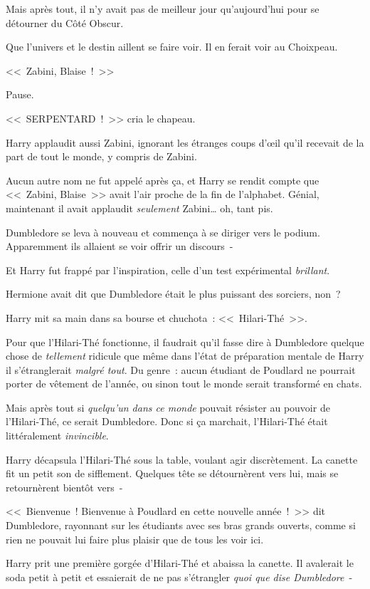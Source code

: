 Mais après tout, il n'y avait pas de meilleur jour qu'aujourd'hui pour se détourner du Côté Obscur.

Que l'univers et le destin aillent se faire voir. Il en ferait voir au Choixpeau.

<<~Zabini, Blaise~!~>>

Pause.

<<~SERPENTARD~!~>> cria le chapeau.

Harry applaudit aussi Zabini, ignorant les étranges coups d'œil qu'il recevait de la part de tout le monde, y compris de Zabini.

Aucun autre nom ne fut appelé après ça, et Harry se rendit compte que <<~Zabini, Blaise~>> avait l'air proche de la fin de l'alphabet. Génial, maintenant il avait applaudit \emph{seulement} Zabini… oh, tant pis.

Dumbledore se leva à nouveau et commença à se diriger vers le podium. Apparemment ils allaient se voir offrir un discours~-

Et Harry fut frappé par l'inspiration, celle d'un test expérimental \emph{brillant}.

Hermione avait dit que Dumbledore était le plus puissant des sorciers, non~?

Harry mit sa main dans sa bourse et chuchota~: <<~Hilari-Thé~>>.

Pour que l'Hilari-Thé fonctionne, il faudrait qu'il fasse dire à Dumbledore quelque chose de \emph{tellement} ridicule que même dans l'état de préparation mentale de Harry il s'étranglerait \emph{malgré tout}. Du genre~: aucun étudiant de Poudlard ne pourrait porter de vêtement de l'année, ou sinon tout le monde serait transformé en chats.

Mais après tout si \emph{quelqu'un dans ce monde} pouvait résister au pouvoir de l'Hilari-Thé, ce serait Dumbledore. Donc si ça marchait, l'Hilari-Thé était littéralement \emph{invincible}.

Harry décapsula l'Hilari-Thé sous la table, voulant agir discrètement. La canette fit un petit son de sifflement. Quelques tête se détournèrent vers lui, mais se retournèrent bientôt vers~-

<<~Bienvenue~! Bienvenue à Poudlard en cette nouvelle année~!~>> dit Dumbledore, rayonnant sur les étudiants avec ses bras grands ouverts, comme si rien ne pouvait lui faire plus plaisir que de tous les voir ici.

Harry prit une première gorgée d'Hilari-Thé et abaissa la canette. Il avalerait le soda petit à petit et essaierait de ne pas s'étrangler \emph{quoi que dise Dumbledore}~-

